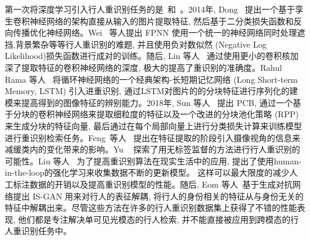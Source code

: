第一次将深度学习引入行人重识别任务的是~\cite{yi2014deep}和~\cite{li2014deepreid}。2014年, Dong~\cite{yi2014deep} 提出一个基于孪生卷积神经网络的架构直接从输入的图片提取特征, 然后基于二分类损失函数和反向传播优化神经网络。Wei~\cite{li2014deepreid} 等人提出 FPNN 使用一个统一的神经网络同时处理遮挡,背景繁杂等等行人重识别的难题, 并且使用负对数似然 (Negative Log Likelihood)损失函数进行成对的训练。随后, Lin 等人~\cite{wu2016personnet} 通过使用更小的卷积核加深了提取特征的卷积神经网络的深度, 极大的提高了重识别的准确度。Rahul Rama 等人~\cite{varior2016siamese} 将循环神经网络的一个经典架构-长短期记忆网络 (Long Short-term Memory, LSTM) 引入进重识别, 通过LSTM对图片的的分块特征进行序列化的建模来提高得到的图像特征的辨别能力。2018年, Sun 等人~\cite{sun2018beyond} 提出 PCB, 通过一个基于分块的卷积神经网络来提取细粒度的特征以及一个改进的分块池化策略 (RPP)来生成分块的特征向量, 最后通过在每个局部向量上进行分类损失计算来训练模型进行重识别检索任务。Feng~等人~\cite{feng2018learning} 提出在特征提取的阶段引入摄像视角的信息来减缓类内的变化带来的影响。Yu ~\cite{yu2019unsupervised} 探索了用无标签监督的方法进行行人重识别的可能性。Liu 等人~\cite{liu2019deep} 为了提高重识别算法在现实生活中的应用, 提出了使用human-in-the-loop的强化学习来收集数据不断的更新模型。 这样可以最大限度的减少人工标注数据的开销以及提高重识别模型的性能。随后, Eom 等人~\cite{eom2019learning}基于生成对抗网络提出 IS-GAN 用来对行人的表征解耦, 将行人的身份相关的特征从与身份无关的特征中解耦出来。尽管这些方法在许多的行人重识别数据集上获得了不错的性能表现, 他们都是专注解决单可见光模态的行人检索, 并不能直接被应用到跨模态的行人重识别任务中。
